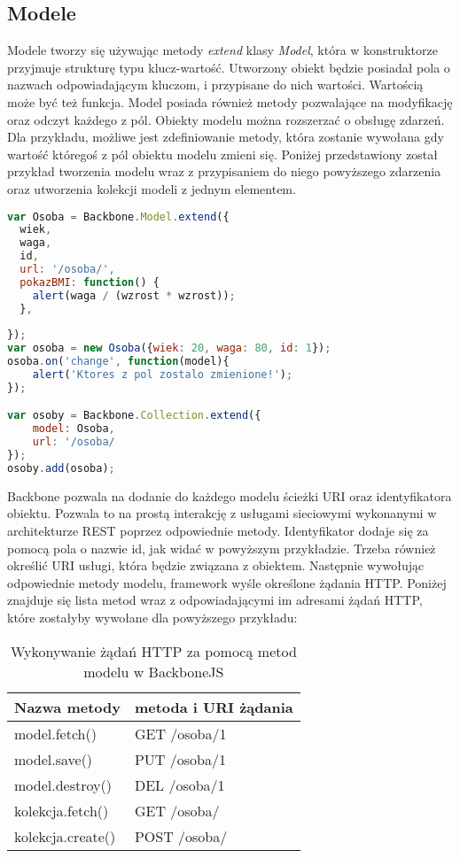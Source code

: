 \subsection{Modele}
Modele tworzy się używając metody \textit{extend} klasy \textit{Model}, która w konstruktorze przyjmuje strukturę typu klucz-wartość. Utworzony obiekt będzie posiadał pola o nazwach odpowiadającym kluczom, i przypisane do nich wartości. Wartością może być też funkcja. 
Model posiada również metody pozwalające na modyfikację oraz odczyt każdego z pól. Obiekty modelu można rozszerzać o obsługę zdarzeń. Dla przykładu, możliwe jest zdefiniowanie metody, która zostanie wywołana gdy wartość któregoś z pól obiektu modelu zmieni się. 
Poniżej przedstawiony został przykład tworzenia modelu wraz z przypisaniem do niego powyższego zdarzenia oraz utworzenia kolekcji modeli z jednym elementem.
\begin{lstlisting}[language=JavaScript]
var Osoba = Backbone.Model.extend({
  wiek,
  waga,
  id,
  url: '/osoba/',
  pokazBMI: function() {
  	alert(waga / (wzrost * wzrost));
  },
  
});
var osoba = new Osoba({wiek: 20, waga: 80, id: 1});
osoba.on('change', function(model){
	alert('Ktores z pol zostalo zmienione!');
});

var osoby = Backbone.Collection.extend({
	model: Osoba,
	url: '/osoba/
});
osoby.add(osoba);
\end{lstlisting}

Backbone pozwala na dodanie do każdego modelu ścieżki URI oraz identyfikatora obiektu. Pozwala to na prostą interakcję z usługami sieciowymi wykonanymi w architekturze REST poprzez odpowiednie metody. Identyfikator dodaje się za pomocą pola o nazwie id, jak widać w powyższym przykładzie. Trzeba również określić URI usługi, która będzie związana z obiektem. Następnie wywołując odpowiednie metody modelu, framework wyśle określone żądania HTTP. Poniżej znajduje się lista metod wraz z odpowiadającymi im adresami żądań HTTP, które zostałyby wywołane dla powyższego przykładu:

\begin{table}[h]
	\caption{Wykonywanie żądań HTTP za pomocą metod modelu w BackboneJS}
	\label{tab:heading-styles}
	\begin{tabularx}{\textwidth}{|X|X|}
		\hline
		Nazwa metody 						& metoda i URI żądania 	\\ 
		\hline
		model.fetch()		 				& GET /osoba/1 	\\ 
		\hline
		model.save()						& PUT /osoba/1  \\ 
		\hline
		model.destroy() 					& DEL /osoba/1 \\ 
		\hline
		kolekcja.fetch()					& GET /osoba/  \\ 
		\hline
		kolekcja.create() 					& POST /osoba/ \\ 
		\hline
	\end{tabularx}
\end{table}


